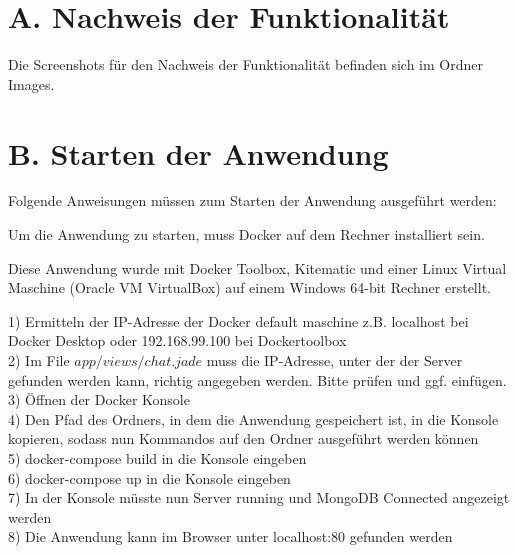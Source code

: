 
\addchap{\langanhang}


\section*{A. Nachweis der Funktionalität}\label{sec:NachweisFunktionalitaet}
Die Screenshots für den Nachweis der Funktionalität befinden sich im Ordner Images.
\pagebreak

\section*{B. Starten der Anwendung}\label{sec:Starten}

Folgende Anweisungen müssen zum Starten der Anwendung ausgeführt werden:

Um die Anwendung zu starten, muss Docker auf dem Rechner installiert sein.

Diese Anwendung wurde mit Docker Toolbox, Kitematic und einer Linux Virtual Maschine 
(Oracle VM VirtualBox) auf einem Windows 64-bit Rechner erstellt. 

1)	Ermitteln der IP-Adresse der Docker default maschine 
	z.B. localhost bei Docker Desktop oder 192.168.99.100 bei Dockertoolbox\\
2)	Im File $app/views/chat.jade$ muss die IP-Adresse, unter der der Server gefunden werden kann, richtig angegeben werden. Bitte prüfen und ggf. einfügen.\\
3)	Öffnen der Docker Konsole\\
4)	Den Pfad des Ordners, in dem die Anwendung gespeichert ist,  in die Konsole kopieren, sodass nun Kommandos auf den Ordner ausgeführt werden können\\
5)	docker-compose build in die Konsole eingeben\\
6)	docker-compose up in die Konsole eingeben\\
7)	In der Konsole müsste nun Server running und MongoDB Connected angezeigt werden\\
8)	Die Anwendung kann im Browser unter localhost:80 gefunden werden\\

 